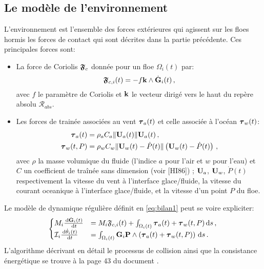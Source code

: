 
\subsection{Le modèle de l'environnement}
L’environnement est l’ensemble des forces extérieures qui agissent sur les floes hormis les forces de contact qui sont décrites dans la partie précédente. Ces principales forces sont:
\begin{itemize}
    \item La force de Coriolis $\bm{\mathrm{\mathfrak{F}}}_c$ donnée pour un floe $\Omega_i(t)$ par:
    $$
    \bm{\mathrm{\mathfrak{F}}}_{c,i}(t) = -f\bm{\mathrm{k}} \wedge \dot{\bm{\mathrm{G}}}_i(t) \,,
    $$
    avec $f$ le paramètre de Coriolis et $\bm{\mathrm{k}}$ le vecteur dirigé vers le haut du repère absolu $\mathcal{R}_{abs}$.
    \item Les forces de trainée associées au vent $\bm{\mathrm{\tau}}_a(t)$ et celle associée à l'océan $\bm{\mathrm{\tau}}_w(t)$: 
    \begin{align*}
        \bm{\mathrm{\tau}}_a(t) &= \rho_a C_a \Vert \bm{\mathrm{U}}_a(t) \Vert \bm{\mathrm{U}}_a(t) \,, \\        
        \bm{\mathrm{\tau}}_w(t,P) &= \rho_w C_w \Vert \bm{\mathrm{U}}_w(t) - \dot{P}(t) \Vert \left(\bm{\mathrm{U}}_w(t) - \dot{P}(t) \right) \,,
    \end{align*}
    avec $\rho$ la masse volumique du fluide (l'indice $a$ pour l'air et $w$ pour l'eau) et $C$ un coefficient de traînée sans dimension (voir [HI86]) ; $\bm{\mathrm{U}}_a$, $\bm{\mathrm{U}}_w$, $\dot{P}(t)$ respectivement la vitesse du vent à l'interface glace/fluide, la vitesse du courant oceanique à l'interface glace/fluide, et la vitesse d'un point $P$ du floe. 
\end{itemize}

Le modèle de dynamique régulière définit en \cref{eq:bilan1} peut se voire expliciter:
\begin{align*}
    \begin{cases}
            M_i \frac{\diff \dot{\bvec{G}}_i(t)}{\diff{t}} &= M_i \mathfrak{F}_{c,i}(t) + \int_{\Omega_i(t)} \bvec{\tau}_a(t) + \bvec{\tau}_w(t,P) \diff s \,,\\
            \mathcal{I}_i \frac{\diff \dot{\theta}_i(t)}{\diff t} &= \int_{\Omega_i(t)} \bvec{G}_i\bvec{P} \wedge \left(\bvec{\tau}_a(t) + \bvec{\tau}_w(t,P)\right) \diff s \,.
    \end{cases}
\end{align*} 
L'algorithme décrivant en détail le processus de collision ainsi que la consistance énergétique se trouve à la page 43 du document \parencite{rabatel2015thesis}.


